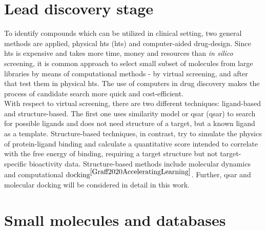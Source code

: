 \section{Lead discovery stage}\label{lead_disc}

To identify compounds which can be utilized in clinical setting, two general methods 
are applied, physical \acrlong{hts} (\acrshort{hts}) and computer-aided drug-design.
Since \acrshort{hts} is expensive and takes more time, money and resources than 
\textit{in silico }screening, it is common approach to select small subset of molecules 
from large libraries by means of computational methods - by virtual screening, and 
after that test them in physical \acrshort{hts}.
The use of computers in drug discovery makes the process of candidate search more 
quick and cost-efficient.\\

With respect to virtual screening, there are two different techniques: ligand-based 
and structure-based.
The first one uses similarity model or \acrlong{qsar} (\acrshort{qsar}) to search 
for possible ligands and does not need structure of a target, but a known ligand 
as a template.
Structure-based techniques, in contrast, try to simulate the physics of protein-ligand 
binding and calculate a quantitative score intended to correlate with the free energy 
of binding, requiring a target structure but not target-specific bioactivity data.
Structure-based methods include molecular dynamics and computational $\text{docking}^{\cite{Graff2020AcceleratingLearning}}$. 
Further, \acrshort{qsar} and molecular docking will be considered in detail in this 
work.\\

\section{Small molecules and databases}

